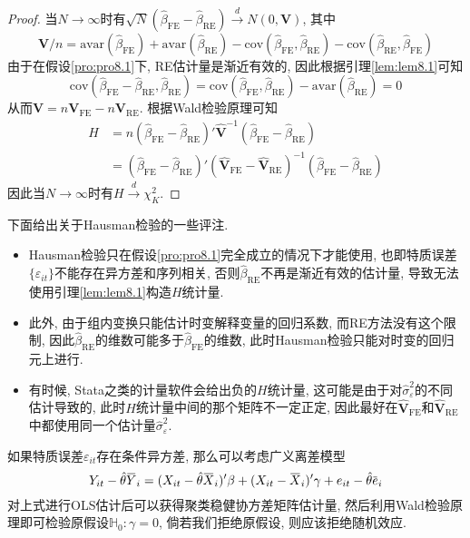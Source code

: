 \documentclass[cn, 12pt, math=mtpro2, bibstyle=apa, blue, twocol]{elegantbook}
\newcommand{\hb}{\hat{\beta}}
\newcommand{\HH}{\mathbb{H}}
\newcommand{\V}{\mathbold{V}}
\newcommand{\overbar}[1]{\mkern 1.5mu\overline{\mkern-1.5mu#1\mkern-1.5mu}\mkern 1.5mu}
\begin{document}
\begin{proof}
  当$N\to\infty$时有$\sqrt{N}(\hb_{\text{FE}}-\hb_{\text{RE}})\xrightarrow{d}N(0,\V)$, 其中
  $$\V/n=\text{avar}(\hb_{\text{FE}})+\text{avar}(\hb_{\text{RE}})-\text{cov}(\hb_{\text{FE}},\hb_{\text{RE}})-\text{cov}(\hb_{\text{RE}},\hb_{\text{FE}})$$
  由于在假设\ref{pro:pro8.1}下, RE估计量是渐近有效的, 因此根据引理\ref{lem:lem8.1}可知
  $$\text{cov}(\hb_{\text{FE}}-\hb_\text{RE},\hb_\text{RE})=\text{cov}(\hb_{\text{FE}},\hb_\text{RE})-\text{avar}(\hb_\text{RE})=0$$
  从而$\V=n\V_{\text{FE}}-n\V_{\text{RE}}$. 根据Wald检验原理可知
  \begin{align*}
  H&=n(\hb_{\text{FE}}-\hb_{\text{RE}})'\hat{\V}^{-1}(\hb_{\text{FE}}-\hb_{\text{RE}}) \\
  &=(\hb_{\text{FE}}-\hb_{\text{RE}})'(\hat{\V}_{\text{FE}}-\hat{\V}_{\text{RE}})^{-1}(\hb_{\text{FE}}-\hb_{\text{RE}})
  \end{align*}
  因此当$N\to\infty$时有$H\xrightarrow{d}\chi^2_K$.

\end{proof}

\begin{remark}
下面给出关于Hausman检验的一些评注.
\begin{itemize}
  \item Hausman检验只在假设\ref{pro:pro8.1}完全成立的情况下才能使用, 也即特质误差$\{\varepsilon_{it}\}$不能存在异方差和序列相关, 否则$\hb_{\text{RE}}$不再是渐近有效的估计量, 导致无法使用引理\ref{lem:lem8.1}构造$H$统计量.
  \item 此外, 由于组内变换只能估计时变解释变量的回归系数, 而RE方法没有这个限制, 因此$\hb_{\text{RE}}$的维数可能多于$\hb_{\text{FE}}$的维数, 此时Hausman检验只能对时变的回归元上进行.

  \item 有时候, Stata之类的计量软件会给出负的$H$统计量, 这可能是由于对$\hat{\sigma}_\varepsilon^2$的不同估计导致的, 此时$H$统计量中间的那个矩阵不一定正定, 因此最好在$\hat{\V}_{\text{FE}}$和$\hat{\V}_{\text{RE}}$中都使用同一个估计量$\hat{\sigma}_\varepsilon^2$.
\end{itemize}
\end{remark}
如果特质误差$\varepsilon_{it}$存在条件异方差, 那么可以考虑广义离差模型
$$Y_{it}-\hat{\theta}\overbar{Y}_i=(X_{it}-\hat{\theta}\overbar{X}_i)'\beta+(X_{it}-\overbar{X}_i)'\gamma+e_{it}-\hat{\theta}\overbar{e}_i$$
对上式进行OLS估计后可以获得聚类稳健协方差矩阵估计量, 然后利用Wald检验原理即可检验原假设$\HH_0: \gamma=0$, 倘若我们拒绝原假设, 则应该拒绝随机效应.
\end{document}
